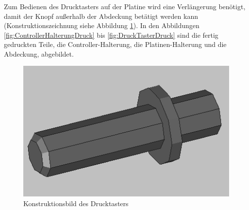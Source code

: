 \begin{minipage}[t]{0.54\textwidth}
\indent Zum Bedienen des Drucktasters auf der Platine wird eine Verlängerung benötigt, damit der Knopf außerhalb der Abdeckung betätigt werden kann (Konstruktionszeichnung siehe Abbildung \ref{fig:DruckTasterKonstruktion}). In den Abbildungen \ref{fig:ControllerHalterungDruck} bis \ref{fig:DruckTasterDruck} sind die fertig gedruckten Teile, die Controller-Halterung, die Platinen-Halterung und die Abdeckung, abgebildet.
\end{minipage}
\begin{minipage}[t]{0.4\textwidth}
\vspace{-7mm}
\begin{figure}[H] %
\includegraphics[width=.7\textwidth]{sec2/images/3DAnbaukomponenten/Konstruktionsbilder/DruckTasterKonstruktion} 
\centering
\captionsetup{width=.9\textwidth}
\caption[Konstruktionsbild des Drucktasters]{Konstruktionsbild des Drucktasters}
\centering
\label{fig:DruckTasterKonstruktion}
\end{figure}
\end{minipage}


